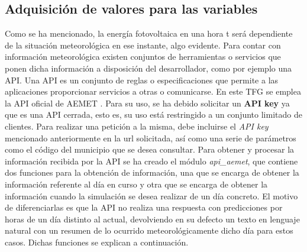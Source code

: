 \subsection{Adquisición de valores para las variables}
Como se ha mencionado, la energía fotovoltaica en una hora t será dependiente de la situación meteorológica en ese instante, algo evidente. Para contar con información meteorológica existen conjuntos de herramientas o servicios que ponen dicha información a disposición del desarrollador, como por ejemplo una API. Una \gls{API} es un conjunto de reglas o especificaciones que permite a las aplicaciones proporcionar servicios a otras o comunicarse. En este \gls{TFG} se emplea la \gls{API} oficial de AEMET \cite{Aemet}. Para su uso, se ha debido solicitar un \textbf{API key} ya que es una \gls{API} cerrada, esto es, su uso está restringido a un conjunto limitado de clientes. Para realizar una petición a la misma, debe incluirse el \textit{API key} mencionado anteriormente en la url solicitada, así como una serie de parámetros como el código del municipio que se desea consultar. Para obtener y procesar la información recibida por la \gls{API} se ha creado el módulo \textit{api\_aemet}, que contiene dos funciones para la obtención de información, una que se encarga de obtener la información referente al día en curso y otra que se encarga de obtener la información cuando la simulación se desea realizar de un día concreto. El motivo de diferenciarlas es que la \gls{API} no realiza una respuesta con predicciones por horas de un día distinto al actual, devolviendo en su defecto un texto en lenguaje natural con un resumen de lo ocurrido meteorológicamente dicho día para estos casos. Dichas funciones se explican a continuación.
